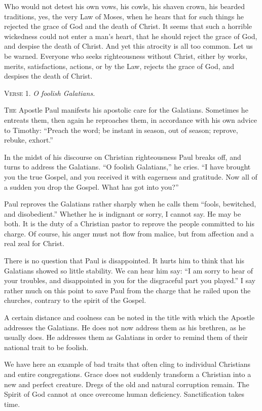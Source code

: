 Who would not detest his own vows, his cowls, his shaven crown, his bearded traditions, yes, the very Law of Moses, when he hears that for such things he rejected the grace of God and the death of Christ. It seems that such a horrible wickedness could not enter a man’s heart, that he should reject the grace of God, and despise the death of Christ. And yet this atrocity is all too common. Let us be warned. Everyone who seeks righteousness without Christ, either by works, merits, satisfactions, actions, or by the Law, rejects the grace of God, and despises the death of Christ.


\textsc{Verse} 1. \emph{O foolish Galatians.}

\textsc{The} Apostle Paul manifests his apostolic care for the Galatians. Sometimes he entreats them, then again he reproaches them, in accordance with his own advice to Timothy: “Preach the word; be instant in season, out of season; reprove, rebuke, exhort.”

In the midst of his discourse on Christian righteousness Paul breaks off, and turns to address the Galatians. “O foolish Galatians,” he cries. “I have brought you the true Gospel, and you received it with eagerness and gratitude. Now all of a sudden you drop the Gospel. What has got into you?”

Paul reproves the Galatians rather sharply when he calls them “fools, bewitched, and disobedient.” Whether he is indignant or sorry, I cannot say. He may be both. It is the duty of a Christian pastor to reprove the people committed to his charge. Of course, his anger must not flow from malice, but from affection and a real zeal for Christ.

There is no question that Paul is disappointed. It hurts him to think that his Galatians showed so little stability. We can hear him say: “I am sorry to hear of your troubles, and disappointed in you for the disgraceful part you played.” I say rather much on this point to save Paul from the charge that he railed upon the churches, contrary to the spirit of the Gospel.

A certain distance and coolness can be noted in the title with which the Apostle addresses the Galatians. He does not now address them as his brethren, as he usually does. He addresses them as Galatians in order to remind them of their national trait to be foolish.

We have here an example of bad traits that often cling to individual Christians and entire congregations. Grace does not suddenly transform a Christian into a new and perfect creature. Dregs of the old and natural corruption remain. The Spirit of God cannot at once overcome human deficiency. Sanctification takes time.

